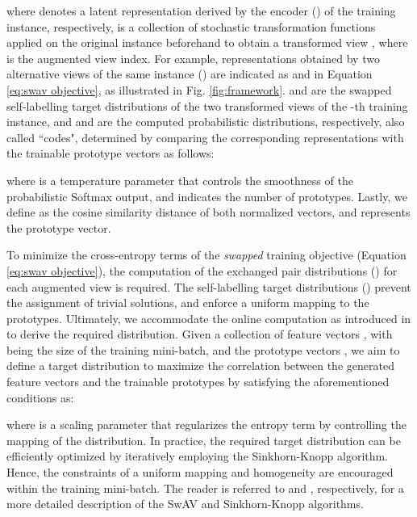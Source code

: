 \documentclass[journal]{IEEEtran}
\begin{document}
where  denotes a latent representation derived by the encoder () of the  training instance, respectively,  is a collection of stochastic transformation functions applied on the original instance beforehand to obtain a transformed view , where  is the augmented view index. For example, representations obtained by two alternative views of the same instance () are indicated as  and  in Equation \ref{eq:swav objective}, as illustrated in Fig. \ref{fig:framework}.  and  are the swapped self-labelling target distributions of the two transformed views of the -th training instance, and  and  are the computed probabilistic distributions, respectively, also called ``codes", determined by comparing the corresponding representations with the trainable prototype vectors  as follows:

where  is a temperature parameter that controls the smoothness of the probabilistic Softmax output, and  indicates the number of prototypes. Lastly, we define  as the cosine similarity distance of both  normalized vectors, and  represents the  prototype vector. \par

To minimize the cross-entropy terms of the \textit{swapped} training objective (Equation \ref{eq:swav objective}), the computation of the exchanged pair distributions () for each augmented view is required. The self-labelling target distributions () prevent the assignment of trivial solutions, and enforce a uniform mapping to the prototypes. Ultimately, we accommodate the online computation as introduced in \cite{caron2020unsupervised} to derive the required distribution. Given a collection of feature vectors , with  being the size of the training mini-batch, and the prototype vectors , we aim to define a target distribution  to maximize the correlation between the generated feature vectors and the trainable prototypes by satisfying the aforementioned conditions as:


where  is a scaling parameter that regularizes the entropy term  by controlling the mapping of the distribution. In practice, the required target distribution can be efficiently optimized by iteratively employing the Sinkhorn-Knopp \cite{NIPS2013_af21d0c9} algorithm. Hence, the constraints of a uniform mapping and homogeneity are encouraged within the training mini-batch. The reader is referred to \cite{caron2020unsupervised} and \cite{NIPS2013_af21d0c9,peyre2020computational}, respectively, for a more detailed description of the SwAV  and Sinkhorn-Knopp algorithms.
\end{document}
